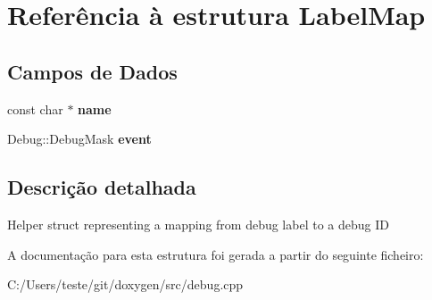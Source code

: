 \hypertarget{struct_label_map}{\section{Referência à estrutura Label\-Map}
\label{struct_label_map}
}
\subsection*{Campos de Dados}
\begin{DoxyCompactItemize}
\item 
\hypertarget{struct_label_map_a8f8f80d37794cde9472343e4487ba3eb}{const char $\ast$ {\bfseries name}}\label{struct_label_map_a8f8f80d37794cde9472343e4487ba3eb}

\item 
\hypertarget{struct_label_map_ac5e60c63e2ac08efe777115f21f067c0}{Debug\-::\-Debug\-Mask {\bfseries event}}\label{struct_label_map_ac5e60c63e2ac08efe777115f21f067c0}

\end{DoxyCompactItemize}


\subsection{Descrição detalhada}
Helper struct representing a mapping from debug label to a debug I\-D 

A documentação para esta estrutura foi gerada a partir do seguinte ficheiro\-:\begin{DoxyCompactItemize}
\item 
C\-:/\-Users/teste/git/doxygen/src/debug.\-cpp\end{DoxyCompactItemize}
